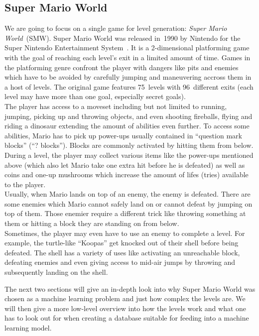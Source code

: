 \subsection{Super Mario World}

We are going to focus on a single game for level generation:
\emph{Super Mario World}~(SMW). Super Mario World was released in~1990
by Nintendo for the Super Nintendo Entertainment
System~\cite{SuperMarioWorld2019}. It is a 2-dimensional platforming
game with the goal of reaching each level's exit in a limited amount
of time. Games in the platforming genre confront the player with
dangers like pits and enemies which have to be avoided by carefully
jumping and maneuvering accross them in a host of levels. The original
game features 75~levels with 96~different exits (each level may have
more than one goal, especially secret goals). \\
The player has access to a moveset including but not limited to
running, jumping, picking up and throwing objects, and even shooting
fireballs, flying and riding a dinosaur extending the amount of
abilities even further. To access some abilities, Mario has to pick up
power-ups usually contained in ``question mark blocks'' (``?
blocks''). Blocks are commonly activated by hitting them from below.
During a level, the player may collect various items like the
power-ups mentioned above (which also let Mario take one extra hit
before he is defeated) as well as coins and one-up mushrooms which
increase the amount of lifes (tries) available to the player. \\
Usually, when Mario lands on top of an enemy, the enemy is defeated.
There are some enemies which Mario cannot safely land on or cannot
defeat by jumping on top of them. Those enemier require a different
trick like throwing something at them or hitting a block they are
standing on from below. \\
Sometimes, the player may even have to use an enemy to complete a
level. For example, the turtle-like ``Koopas'' get knocked out of
their shell before being defeated. The shell has a variety of uses
like activating an unreachable block, defeating enemies and even
giving access to mid-air jumps by throwing and subsequently landing on
the shell.

The next two sections will give an in-depth look into why Super Mario
World was chosen as a machine learning problem and just how complex
the levels are. We will then give a more low-level overview into how
the levels work and what one has to look out for when creating a
database suitable for feeding into a machine learning model.

